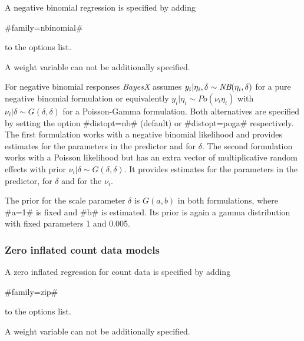 A negative binomial regression is specified by adding

#family=nbinomial#

to the options list.

A weight variable can not be additionally specified.

For negative binomial responses {\em BayesX} assumes $y_i |
\eta_i,\delta \sim \mbox{\it NB}(\eta_i,\delta)$ for a pure negative binomial
formulation or equivalently $y_i | \eta_i \sim Po(\nu_i \eta_i)$
with $\nu_i|\delta \sim G(\delta, \delta)$ for a Poisson-Gamma
formulation. Both alternatives are specified by setting the option
#distopt=nb# (default) or #distopt=poga# respectively. The first
formulation works with a negative binomial likelihood and provides
estimates for the parameters in the predictor and for $\delta$.
The second formulation works with a Poisson likelihood but has an
extra vector of multiplicative random effects with prior
$\nu_i|\delta \sim G(\delta, \delta)$. It provides estimates for
the parameters in the predictor, for $\delta$ and for the $\nu_i$.

The prior for the scale parameter $\delta$ is $G(a,b)$ in both
formulations, where #a=1# is fixed and #b# is estimated. Its prior
is again a gamma distribution with fixed parameters 1 and 0.005.

\subsubsection*{Zero inflated count data models}

A zero inflated regression for count data is specified by adding

#family=zip#

to the options list.

A weight variable can not be additionally specified.

